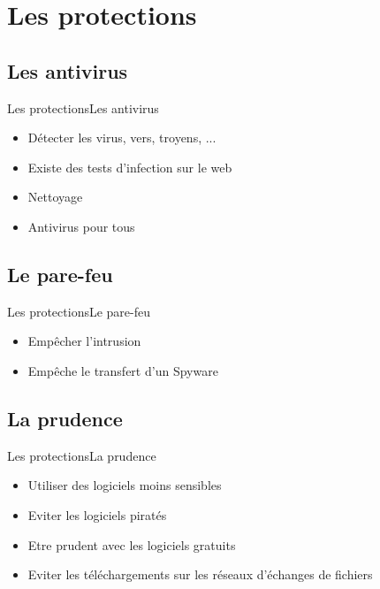 \documentclass[10pt]{beamer}
\begin{document}
\section{Les protections}

\subsection{Les antivirus}

\begin{frame}{Les protections}{Les antivirus}
  \begin{itemize}
    \item<1-> Détecter les virus, vers, troyens, ...
    \item<2-> Existe des tests d'infection sur le web
    \item<3-> Nettoyage
    \item<4-> Antivirus pour tous
  \end{itemize}
\end{frame}

\subsection{Le pare-feu}

\begin{frame}{Les protections}{Le pare-feu}
  \begin{itemize}
    \item<1-> Empêcher l'intrusion
    \item<2-> Empêche le transfert d'un Spyware
  \end{itemize}
\end{frame}

\subsection{La prudence}

\begin{frame}{Les protections}{La prudence}
   \begin{itemize}
    \item<1-> Utiliser des logiciels moins sensibles 
    \item<2-> Eviter les logiciels piratés
    \item<3-> Etre prudent avec les logiciels gratuits
    \item<4-> Eviter les téléchargements sur les réseaux d'échanges de fichiers 
  \end{itemize}
\end{frame}


{\aauwavesbg
\begin{frame}
\end{frame}}
\end{document}
